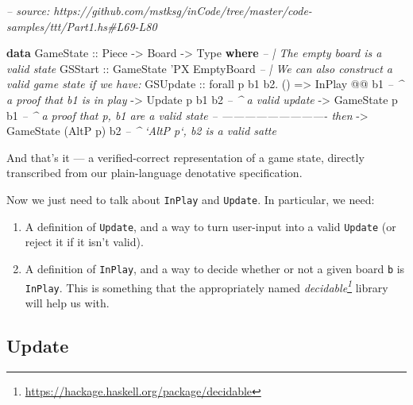 \documentclass[]{article}
\newenvironment{Shaded}{}{}
\newcommand{\CommentTok}[1]{\textcolor[rgb]{0.38,0.63,0.69}{\textit{#1}}}
\newcommand{\DataTypeTok}[1]{\textcolor[rgb]{0.56,0.13,0.00}{#1}}
\newcommand{\FunctionTok}[1]{\textcolor[rgb]{0.02,0.16,0.49}{#1}}
\newcommand{\KeywordTok}[1]{\textcolor[rgb]{0.00,0.44,0.13}{\textbf{#1}}}
\newcommand{\NormalTok}[1]{#1}
\newcommand{\OtherTok}[1]{\textcolor[rgb]{0.00,0.44,0.13}{#1}}
\renewcommand{\href}[2]{#2\footnote{\url{#1}}}
\begin{document}
\begin{Shaded}
\begin{Highlighting}[]
\CommentTok{-- source: https://github.com/mstksg/inCode/tree/master/code-samples/ttt/Part1.hs#L69-L80}

\KeywordTok{data} \DataTypeTok{GameState}\OtherTok{ ::} \DataTypeTok{Piece} \OtherTok{->} \DataTypeTok{Board} \OtherTok{->} \DataTypeTok{Type} \KeywordTok{where}
    \CommentTok{-- | The empty board is a valid state}
    \DataTypeTok{GSStart}
\OtherTok{        ::} \DataTypeTok{GameState}\NormalTok{ '}\DataTypeTok{PX} \DataTypeTok{EmptyBoard}
    \CommentTok{-- | We can also construct a valid game state if we have:}
    \DataTypeTok{GSUpdate}
\OtherTok{        ::}\NormalTok{ forall p b1 b2}\FunctionTok{.}\NormalTok{ ()}
        \OtherTok{=>} \DataTypeTok{InPlay}          \FunctionTok{@@}\NormalTok{ b1     }\CommentTok{-- ^ a proof that b1 is in play}
        \OtherTok{->} \DataTypeTok{Update}\NormalTok{    p        b1 b2  }\CommentTok{-- ^ a valid update}
        \OtherTok{->} \DataTypeTok{GameState}\NormalTok{ p        b1     }\CommentTok{-- ^ a proof that p, b1 are a valid state}
        \CommentTok{-- ---------------------------- then}
        \OtherTok{->} \DataTypeTok{GameState}\NormalTok{ (}\DataTypeTok{AltP}\NormalTok{ p)    b2  }\CommentTok{-- ^ `AltP p`, b2 is a valid satte}
\end{Highlighting}
\end{Shaded}

And that's it --- a verified-correct representation of a game state, directly
transcribed from our plain-language denotative specification.

Now we just need to talk about \texttt{InPlay} and \texttt{Update}. In
particular, we need:

\begin{enumerate}
\def\labelenumi{\arabic{enumi}.}
\tightlist
\item
  A definition of \texttt{Update}, and a way to turn user-input into a valid
  \texttt{Update} (or reject it if it isn't valid).
\item
  A definition of \texttt{InPlay}, and a way to decide whether or not a given
  board \texttt{b} is \texttt{InPlay}. This is something that the appropriately
  named \emph{\href{https://hackage.haskell.org/package/decidable}{decidable}}
  library will help us with.
\end{enumerate}

\hypertarget{update}{%
\subsection{Update}\label{update}}
\end{document}
